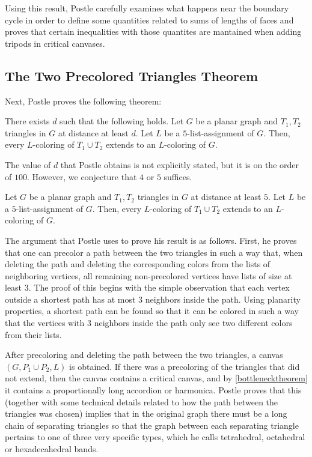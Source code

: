 
Using this result, Postle carefully examines what happens near the boundary cycle in order to define some quantities related to sums of lengths of faces and proves that certain inequalities with those quantites are mantained when adding tripods in critical canvases. 



\subsection{The Two Precolored Triangles Theorem}

Next, Postle proves the following theorem:

\begin{theorem}
	There exists $d$ such that the following holds.
	Let $G$ be a planar graph and $T_1, T_2$ triangles in $G$ at distance at least $d$. Let $L$ be a $5$-list-assignment of $G$. Then, every $L$-coloring of $T_1 \cup T_2$ extends to an $L$-coloring of $G$.
\end{theorem}

The value of $d$ that Postle obtains is not explicitly stated, but it is on the order of $100$. However, we conjecture that $4$ or $5$ suffices.

\begin{conjecture}
Let $G$ be a planar graph and $T_1, T_2$ triangles in $G$ at distance at least $5$. Let $L$ be a $5$-list-assignment of $G$. Then, every $L$-coloring of $T_1 \cup T_2$ extends to an $L$-coloring of $G$.
\end{conjecture}

The argument that Postle uses to prove his result is as follows. First, he proves that one can precolor a path between the two triangles in such a way that, when deleting the path and deleting the corresponding colors from the lists of neighboring vertices, all remaining non-precolored vertices have lists of size at least $3$. The proof of this begins with the simple observation that each vertex outside a shortest path has at most $3$ neighbors inside the path. Using planarity properties, a shortest path can be found so that it can be colored in such a way that the vertices with $3$ neighbors inside the path only see two different colors from their lists.

After precoloring and deleting the path between the two triangles, a canvas $(G, P_1 \cup P_2, L)$ is obtained. If there was a precoloring of the triangles that did not extend, then the canvas contains a critical canvas, and by \ref{bottlenecktheorem} it contains a proportionally long accordion or harmonica. Postle proves that this (together with some technical details related to how the path between the triangles was chosen) implies that in the original graph there must be a long chain of separating triangles so that the graph between each separating triangle pertains to one of three very specific types, which he calls tetrahedral, octahedral or hexadecahedral bands. 

